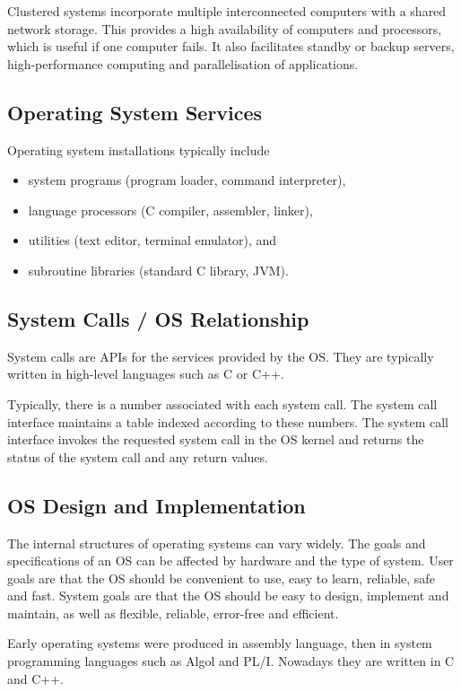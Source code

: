 Clustered systems incorporate multiple interconnected computers with a shared network storage.
This provides a high availability of computers and processors, which is useful if one computer fails.
It also facilitates standby or backup servers, high-performance computing and parallelisation of applications.

\subsection{Operating System Services}

Operating system installations typically include
\begin{itemize}
  \item system programs (program loader, command interpreter),
  \item language processors (C compiler, assembler, linker),
  \item utilities (text editor, terminal emulator), and
  \item subroutine libraries (standard C library, JVM).
\end{itemize}

\subsection{System Calls / OS Relationship}

System calls are APIs for the services provided by the OS\@.
They are typically written in high-level languages such as C or C++.

Typically, there is a number associated with each system call.
The system call interface maintains a table indexed according to these numbers.
The system call interface invokes the requested system call in the OS kernel and returns the status of the system call and any return values.

\subsection{OS Design and Implementation}

The internal structures of operating systems can vary widely.
The goals and specifications of an OS can be affected by hardware and the type of system.
User goals are that the OS should be convenient to use, easy to learn, reliable, safe and fast.
System goals are that the OS should be easy to design, implement and maintain, as well as flexible, reliable, error-free and efficient.

Early operating systems were produced in assembly language, then in system programming languages such as Algol and PL/I\@.
Nowadays they are written in C and C++.

